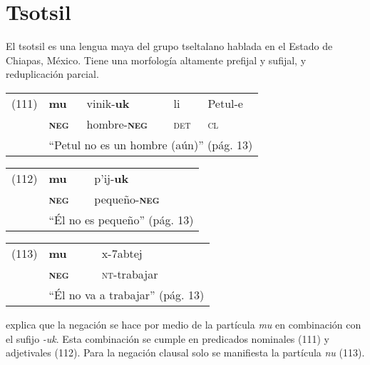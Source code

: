 \section*{Tsotsil}

\noindent El tsotsil es una lengua maya del grupo tseltalano hablada en el Estado de Chiapas, México. Tiene una morfología altamente prefijal y sufijal, y reduplicación parcial. \vspace{0.5cm}

{\setmainfont{Charis SIL}

\begin{tabular}{lllll}
(111) & \textbf{mu} & vinik-\textbf{uk} & li & Petul-e \\
& \textsc{\textbf{neg}} & hombre-\textsc{\textbf{neg}} & \textsc{det} & \textsc{cl} \\
& \multicolumn{4}{l}{``Petul no es un hombre (aún)'' (pág. 13)}
\end{tabular} \vspace{0.5cm}

\begin{tabular}{lll}
(112) & \textbf{mu} & p'ij-\textbf{uk} \\
& \textsc{\textbf{neg}} & pequeño-\textsc{\textbf{neg}} \\
& \multicolumn{2}{l}{``Él no es pequeño'' (pág. 13)}
\end{tabular} \vspace{0.5cm}

\begin{tabular}{lll}
(113) & \textbf{mu} & x-7abtej \\
& \textsc{\textbf{neg}} & \textsc{nt}-trabajar \\
& \multicolumn{2}{l}{``Él no va a trabajar'' (pág. 13)}
\end{tabular} \vspace{0.5cm}

}

\textcolor{MidnightBlue}{\citet{Tzotzil}} explica que la negación se hace por medio de la partícula {\setmainfont{Charis SIL} \textit{mu}} en combinación con el sufijo {\setmainfont{Charis SIL} \textit{-uk}}. Esta combinación se cumple en predicados nominales (111) y adjetivales (112). Para la negación clausal solo se manifiesta la partícula {\setmainfont{Charis SIL} \textit{nu}} (113).